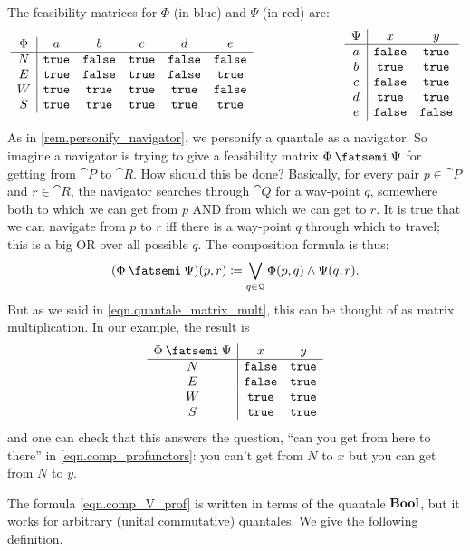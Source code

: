 \documentclass[7Sketches]{subfiles}
\begin{document}
The feasibility matrices for $\Phi$ (in blue) and $\Psi$ (in red) are:
\[
\begin{array}{c|ccccc}
	\Phi&a&b&c&d&e\\\hline
	N & \mathtt{true}& \mathtt{false}& \mathtt{true}& \mathtt{false}& \mathtt{false}\\ 
	E & \mathtt{true}& \mathtt{false}& \mathtt{true}& \mathtt{false}& \mathtt{true}\\
	W & \mathtt{true}& \mathtt{true} & \mathtt{true}& \mathtt{true} & \mathtt{false}\\ 
	S & \mathtt{true}& \mathtt{true} & \mathtt{true}& \mathtt{true} & \mathtt{true}
\end{array}
\hspace{1in}
\begin{array}{c|cc}
	\Psi&x&y\\\hline
	a & \mathtt{false}& \mathtt{true}\\
	b & \mathtt{true} & \mathtt{true}\\
	c & \mathtt{false}& \mathtt{true}\\
	d & \mathtt{true} & \mathtt{true}\\
	e & \mathtt{false}&\mathtt{false}
\end{array}
\]
As in \cref{rem.personify_navigator}, we personify a quantale as a
navigator.%
 So
imagine a navigator is trying to give a feasibility matrix $\Phi\cp\Psi$ for
getting from $\cat{P}$ to $\cat{R}$. How should this be done? Basically, for
every pair $p\in\cat{P}$ and $r\in\cat{R}$, the navigator searches through
$\cat{Q}$ for a way-point $q$, somewhere both to which we can get from $p$ AND
from which we can get to $r$. It is true that we can navigate from $p$ to $r$ iff there is a way-point $q$ through which to travel; this is a big OR over all possible $q$. The
composition formula is thus:
\begin{equation}%
\label{eqn.comp_V_prof}
  (\Phi\cp\Psi)(p,r)\coloneqq\bigvee_{q\in\cat{Q}}\Phi(p,q)\wedge\Psi(q,r).
\end{equation}
But as we said in \cref{eqn.quantale_matrix_mult}, this can be thought of as matrix multiplication. In our
example, the result is
\[
\begin{array}{c|cc}
	\Phi\cp\Psi&x&y\\\hline
	N & \false& \true\\
	E & \false& \true\\
	W & \true & \true\\
	S & \true & \true
\end{array}
\]
and one can check that this answers the question, ``can you get from here to there'' in \cref{eqn.comp_profunctors}: you can't get from $N$ to $x$ but you can get from $N$ to $y$.

The formula \eqref{eqn.comp_V_prof} is written in terms of the quantale $\mathbf{Bool}$,
but it works for arbitrary (unital commutative) quantales. We give the following
definition.
\end{document}
